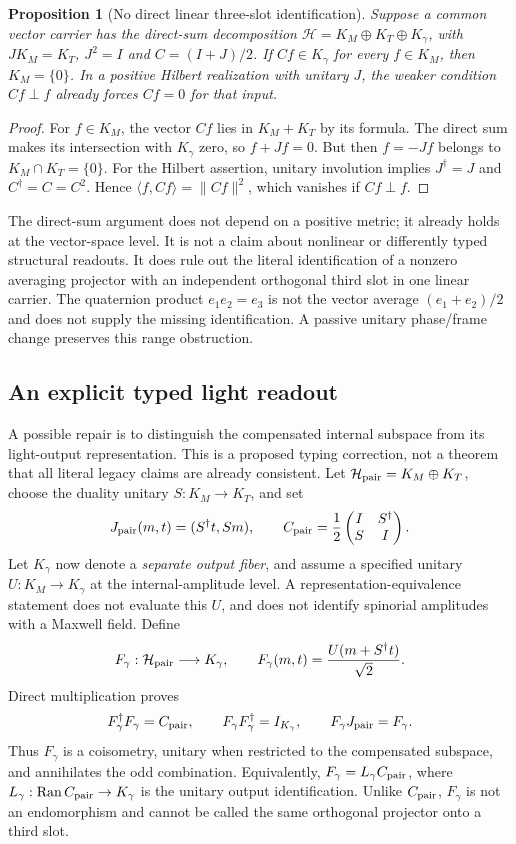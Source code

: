 \documentclass[11pt,a4paper]{article}
\newtheorem{proposition}{Proposition}
\begin{document}
\begin{proposition}[No direct linear three-slot identification]
Suppose a common vector carrier has the direct-sum decomposition
$\mathcal H=K_M\oplus K_T\oplus K_\gamma$, with $JK_M=K_T$,
$J^2=I$ and $C=(I+J)/2$. If $Cf\in K_\gamma$ for every
$f\in K_M$, then $K_M=\{0\}$.
In a positive Hilbert realization with unitary $J$, the weaker
condition $Cf\perp f$ already forces $Cf=0$ for that input.
\end{proposition}
\begin{proof}
For $f\in K_M$, the vector $Cf$ lies in $K_M+K_T$ by its formula.
The direct sum makes its intersection with $K_\gamma$ zero, so
$f+Jf=0$. But then $f=-Jf$ belongs to $K_M\cap K_T=\{0\}$.
For the Hilbert assertion, unitary involution implies
$J^\dagger=J$ and $C^\dagger=C=C^2$. Hence
$\langle f,Cf\rangle=\|Cf\|^2$, which vanishes if $Cf\perp f$.
\end{proof}

The direct-sum argument does not depend on a positive metric; it
already holds at the vector-space level. It is not a claim about
nonlinear or differently typed structural readouts. It does rule out
the literal identification of a nonzero averaging projector with
an independent orthogonal third slot in one linear carrier.
The quaternion product $e_1e_2=e_3$ is not the vector average
$(e_1+e_2)/2$ and does not supply the missing identification.
A passive unitary phase/frame change preserves this range obstruction.

\subsection{An explicit typed light readout}

A possible repair is to distinguish the compensated internal
subspace from its light-output representation. This is a proposed
typing correction, not a theorem that all literal legacy claims are
already consistent. Let
$\mathcal H_{\rm pair}=K_M\oplus K_T$, choose the duality unitary
$S:K_M\to K_T$, and set
\[
 J_{\rm pair}(m,t)=(S^\dagger t,Sm),\qquad
 C_{\rm pair}=\frac12
 \begin{pmatrix}I&S^\dagger\\S&I\end{pmatrix}.
\]
Let $K_\gamma$ now denote a \emph{separate output fiber}, and assume
a specified unitary $U:K_M\to K_\gamma$ at the internal-amplitude
level. A representation-equivalence statement does not evaluate this
$U$, and does not identify spinorial amplitudes with a Maxwell field.
Define
\[
 F_\gamma:\mathcal H_{\rm pair}\longrightarrow K_\gamma,
 \qquad F_\gamma(m,t)=\frac{U(m+S^\dagger t)}{\sqrt2}.
\]
Direct multiplication proves
\[
 F_\gamma^\dagger F_\gamma=C_{\rm pair},\qquad
 F_\gamma F_\gamma^\dagger=I_{K_\gamma},\qquad
 F_\gamma J_{\rm pair}=F_\gamma.
\]
Thus $F_\gamma$ is a coisometry, unitary when restricted to the
compensated subspace, and annihilates the odd combination. Equivalently,
$F_\gamma=L_\gamma C_{\rm pair}$, where
$L_\gamma:\operatorname{Ran}C_{\rm pair}\to K_\gamma$ is the
unitary output identification. Unlike $C_{\rm pair}$,
$F_\gamma$ is not an endomorphism and cannot be called the same
orthogonal projector onto a third slot.
\end{document}
